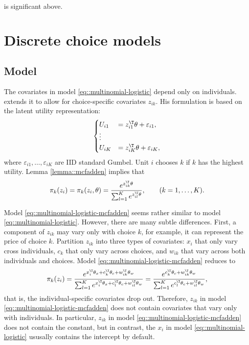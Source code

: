  is significant above. 



\section{Discrete choice models}\label{sec::discretechioce}


\subsection{Model}
The covariates in model \eqref{eq::multinomial-logistic} depend only on individuals. 
\citet{mcfadden1974conditional} extends it to allow for choice-specific covariates $z_{ik}$. His formulation is based on the latent utility representation: 
\[
\begin{cases}
U_{i1} & =   z_{i1}^{\T} \theta +\varepsilon_{i1},\\
\vdots\\
U_{iK} & =z_{iK}^{\T} \theta +\varepsilon_{iK},
\end{cases}
\]
where $\varepsilon_{i1},\ldots,\varepsilon_{iK}$ are IID standard Gumbel. Unit $i$ chooses $k$ if $k$ has the highest utility. Lemma \ref{lemma::mcfadden} implies that
\begin{eqnarray}
\pi_{k}(z_{i})=\pi_{k}(z_{i},\theta)=\frac{e^{  z_{ik}^{\T}\theta }  }{\sum_{ l =1}^{K}e^{ z_{i l }^{\T}\theta } } ,\qquad(k=1,\ldots,K) .
\label{eq::multinomial-logistic-mcfadden}
\end{eqnarray}


Model \eqref{eq::multinomial-logistic-mcfadden} seems rather similar to model \eqref{eq::multinomial-logistic}. However, there are many subtle differences. First, a component of $z_{ik}$ may vary only with choice $k$, for example, it can represent the price of choice $k$. Partition $z_{ik}$ into three types of covariates: $x_i$ that only vary cross individuals, $c_k$ that only vary across choices, and $w_{ik}$ that vary across both individuals and choices. Model \eqref{eq::multinomial-logistic-mcfadden} reduces to
$$
\pi_{k}(z_{i})  =\frac{e^{  x_{i}^{\T}\theta_x + c_k^{\T}\theta_c + w_{ik}^{\T} \theta_w }  }
{\sum_{ l =1}^{K}e^{ x_{i}^{\T}\theta_x + c_{ l }^{\T}\theta_c + w_{i l }^{\T} \theta_w }  }  
=\frac{e^{   c_k^{\T}\theta_c + w_{ik}^{\T} \theta_w }  }
{\sum_{ l =1}^{K}e^{   c_{ l }^{\T}\theta_c + w_{i l }^{\T} \theta_w } }  ,
$$
that is, the individual-specific covariates drop out. Therefore, $z_{ik}$ in model \eqref{eq::multinomial-logistic-mcfadden} does not contain covariates that vary only with individuals. In particular, $z_{ik}$ in model \eqref{eq::multinomial-logistic-mcfadden} does not contain the constant, but in contrast, the $x_i$ in model \eqref{eq::multinomial-logistic} ususally contains the intercept by default. 


